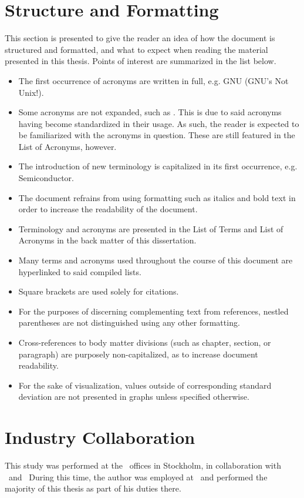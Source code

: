\section*{Structure and Formatting}
\label{sec:preface_structureandformatting}
This section is presented to give the reader an idea of how the document is structured and formatted, and what to expect when reading the material presented in this thesis.
Points of interest are summarized in the list below.
\begin{itemize}[noitemsep]
	\item The first occurrence of acronyms are written in full, e.g. GNU (GNU's Not Unix!).
	\item Some acronyms are not expanded, such as \dvttermcpu . This is due to said acronyms having become standardized in their usage. As such, the reader is expected to be familiarized with the acronyms in question. These are still featured in the List of Acronyms, however. 
	\item The introduction of new terminology is capitalized in its first occurrence, e.g. Semiconductor.
	\item The document refrains from using formatting such as italics and bold text in order to increase the readability of the document.
	\item Terminology and acronyms are presented in the List of Terms and List of Acronyms in the back matter of this dissertation.
	\item Many terms and acronyms used throughout the course of this document are hyperlinked to said compiled lists.
	\item Square brackets are used solely for citations.
	\item For the purposes of discerning complementing text from references, nestled parentheses are not distinguished using any other formatting.
	\item Cross-references to body matter divisions (such as chapter, section, or paragraph) are purposely non-capitalized, as to increase document readability.
	\item For the sake of visualization, values outside of corresponding standard deviation are not presented in graphs unless specified otherwise.
\end{itemize}

\section*{Industry Collaboration}
\label{sec:preface_industrycollaboration}
This study was performed at the \dvttermintel\ offices in Stockholm, in collaboration with \dvttermintel\ and \dvttermwindriver\
During this time, the author was employed at \dvttermintel\ and performed the majority of this thesis as part of his duties there.

